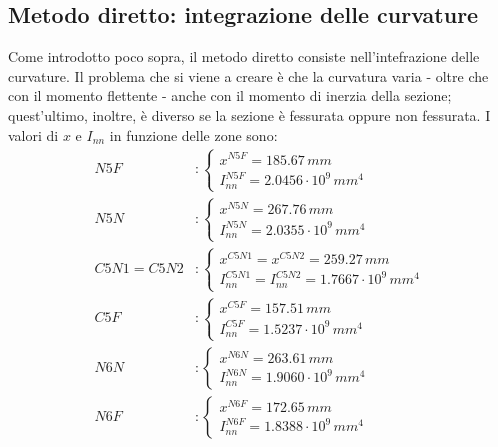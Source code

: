 \subsection{Metodo diretto: integrazione delle curvature}
Come introdotto poco sopra, il metodo diretto consiste nell'intefrazione delle curvature. Il problema che si viene a creare è che la curvatura varia - oltre che con il momento flettente - anche con il momento di inerzia della sezione; quest'ultimo, inoltre, è diverso se la sezione è fessurata oppure non fessurata. I valori di $x$ e $I_{nn}$ in funzione delle zone sono:
\begin{align*}
    N5F&:
	\begin{cases}
		x^{N5F} = 185.67\,mm\\
		I_{nn}^{N5F} = 2.0456\cdot 10^9\,mm^4
	\end{cases}\\
	N5N&:
	\begin{cases}
		x^{N5N} = 267.76\,mm\\
		I_{nn}^{N5N} = 2.0355\cdot 10^9\,mm^4
	\end{cases}\\
	C5N1 = C5N2&:
	\begin{cases}
		x^{C5N1} = x^{C5N2}  = 259.27\,mm\\
		I_{nn}^{C5N1} = I_{nn}^{C5N2} = 1.7667\cdot 10^9\,mm^4
	\end{cases}\\
	C5F&:
	\begin{cases}
		x^{C5F} = 157.51\,mm\\
		I_{nn}^{C5F} = 1.5237\cdot 10^9\,mm^4
	\end{cases}\\
	N6N&:
	\begin{cases}
	x^{N6N} = 263.61\,mm\\
	I_{nn}^{N6N} =1.9060 \cdot 10^9\,mm^4
	\end{cases}\\
	N6F&:
	\begin{cases}
	x^{N6F} = 172.65\,mm\\
	I_{nn}^{N6F} = 1.8388\cdot 10^9\,mm^4
	\end{cases}\\
\end{align*}

